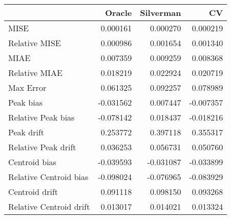 \begin{tabular}{lrrr}
  \hline
 & Oracle & Silverman & CV \\ 
  \hline
MISE & 0.000161 & 0.000270 & 0.000219 \\ 
  Relative MISE & 0.000986 & 0.001654 & 0.001340 \\ 
  MIAE & 0.007359 & 0.009259 & 0.008368 \\ 
  Relative MIAE & 0.018219 & 0.022924 & 0.020719 \\ 
  Max Error & 0.061325 & 0.092257 & 0.078989 \\ 
  Peak bias & -0.031562 & 0.007447 & -0.007357 \\ 
  Relative Peak bias & -0.078142 & 0.018437 & -0.018216 \\ 
  Peak drift & 0.253772 & 0.397118 & 0.355317 \\ 
  Relative Peak drift & 0.036253 & 0.056731 & 0.050760 \\ 
  Centroid bias & -0.039593 & -0.031087 & -0.033899 \\ 
  Relative Centroid bias & -0.098024 & -0.076965 & -0.083929 \\ 
  Centroid drift & 0.091118 & 0.098150 & 0.093268 \\ 
  Relative Centroid drift & 0.013017 & 0.014021 & 0.013324 \\ 
   \hline
\end{tabular}
